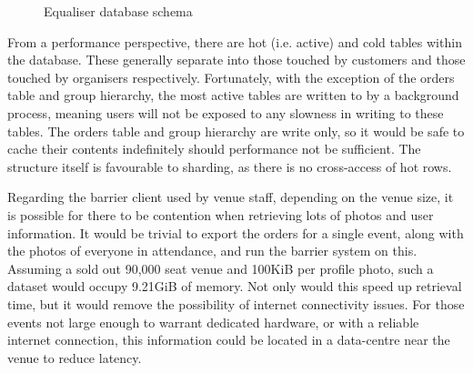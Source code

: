 \documentclass[12pt,a4paper]{bhamdissertation}
\begin{document}
\begin{landscape}
    \thispagestyle{empty}
    \begin{figure}[p]
        \vspace*{-2cm}
        \caption{Equaliser database schema}
        \label{fig:database}
    \end{figure}
\end{landscape}

From a performance perspective, there are hot (i.e. active) and cold tables within the database. These generally separate into those touched by customers and those touched by organisers respectively. Fortunately, with the exception of the orders table and group hierarchy, the most active tables are written to by a background process, meaning users will not be exposed to any slowness in writing to these tables. The orders table and group hierarchy are write only, so it would be safe to cache their contents indefinitely should performance not be sufficient. The structure itself is favourable to sharding, as there is no cross-access of hot rows.

Regarding the barrier client used by venue staff, depending on the venue size, it is possible for there to be contention when retrieving lots of photos and user information. It would be trivial to export the orders for a single event, along with the photos of everyone in attendance, and run the barrier system on this. Assuming a sold out 90,000 seat venue and 100KiB per profile photo, such a dataset would occupy 9.21GiB of memory. Not only would this speed up retrieval time, but it would remove the possibility of internet connectivity issues. For those events not large enough to warrant dedicated hardware, or with a reliable internet connection, this information could be located in a data-centre near the venue to reduce latency.
\end{document}
